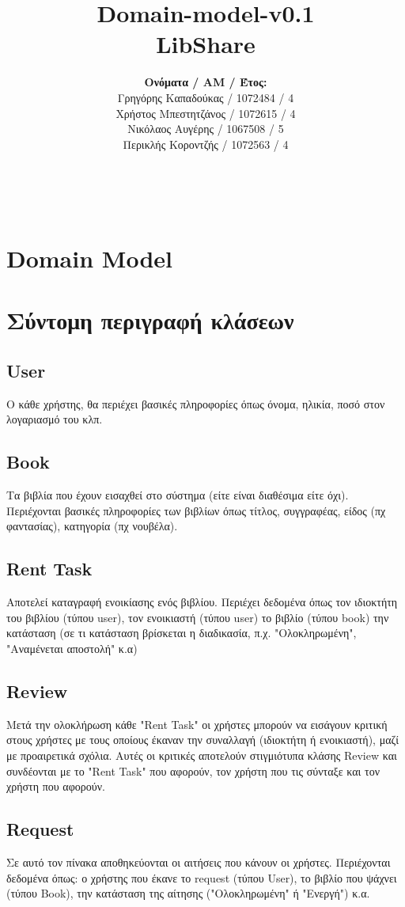\documentclass[12pt,a4paper]{article}
\title{Domain-model-v0.1 \\ LibShare}
\author{\textbf{Ονόματα / ΑΜ / Έτος:} \\ Γρηγόρης Καπαδούκας / 1072484 / 4\textdegree \\ Χρήστος Μπεστητζάνος / 1072615 / 4\textdegree \\ Νικόλαος Αυγέρης / 1067508 / 5\textdegree \\ Περικλής Κοροντζής / 1072563 / 4\textdegree}
\begin{document}
\makeatletter
\begin{center}
	\LARGE{\@title} \\
	\pagebreak
    \begin{LARGE}\@author\end{LARGE} 
    \pagebreak
\end{center}

\section{Domain Model}
\section{Σύντομη περιγραφή κλάσεων}

\subsection{User}
Ο κάθε χρήστης, θα περιέχει βασικές πληροφορίες όπως όνομα, ηλικία, ποσό στον λογαριασμό του κλπ.

\subsection{Book}
Τα βιβλία που έχουν εισαχθεί στο σύστημα (είτε είναι διαθέσιμα είτε όχι). Περιέχονται βασικές πληροφορίες των βιβλίων όπως τίτλος, συγγραφέας, είδος (πχ φαντασίας), κατηγορία (πχ νουβέλα).

\subsection{Rent Task}
Αποτελεί καταγραφή ενοικίασης ενός βιβλίου. Περιέχει δεδομένα όπως τον ιδιοκτήτη του βιβλίου (τύπου user), τον ενοικιαστή (τύπου user) το βιβλίο (τύπου book) την κατάσταση (σε τι κατάσταση βρίσκεται η διαδικασία, π.χ. "Ολοκληρωμένη", "Αναμένεται αποστολή" κ.α)

\subsection{Review}
Μετά την ολοκλήρωση κάθε "Rent Task" οι χρήστες μπορούν να εισάγουν κριτική στους χρήστες με τους οποίους έκαναν την συναλλαγή (ιδιοκτήτη ή ενοικιαστή), μαζί με προαιρετικά σχόλια. Αυτές οι κριτικές αποτελούν στιγμιότυπα κλάσης Review και συνδέονται με το "Rent Task" που αφορούν, τον χρήστη που τις σύνταξε και τον χρήστη που αφορούν.

\subsection{Request}
Σε αυτό τον πίνακα αποθηκεύονται οι αιτήσεις που κάνουν οι χρήστες. Περιέχονται δεδομένα όπως: ο χρήστης που έκανε το request (τύπου User), το βιβλίο που ψάχνει (τύπου Book), την κατάσταση της αίτησης ("Ολοκληρωμένη" ή "Ενεργή") κ.α.
\end{document}
